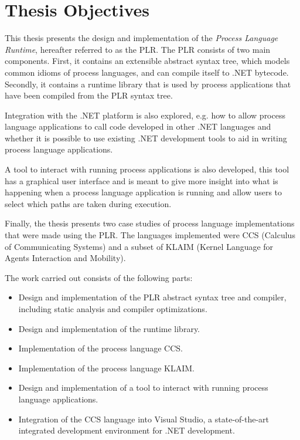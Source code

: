 \section{Thesis Objectives}

	This thesis presents the design and implementation of the \textit{Process 
	Language Runtime}, hereafter referred to as the PLR. The PLR consists of two 
	main components. First, it contains an extensible abstract syntax tree, 
	which models common idioms of process languages, and can compile itself to 
	.NET bytecode. Secondly, it contains a runtime library that is used by 
	process applications that have been compiled from the PLR syntax tree. 

	Integration with the .NET platform is also explored, e.g. how to allow 
	process language applications to call code developed in other .NET languages 
	and whether it is possible to use existing .NET development tools to aid in 
	writing process language applications. 
	
	A tool to interact with running process applications is also developed, this 
	tool has a graphical user interface and is meant to give more insight into 
	what is happening when a process language application is running and allow 
	users to select which paths are taken during execution.

	Finally, the thesis presents two case studies of process language 
	implementations that were made using the PLR. The languages implemented were 
	CCS (Calculus of Communicating Systems) and a subset of KLAIM (Kernel 
	Language for Agents Interaction and Mobility).

	\newpage
	The work carried out consists of the following parts:

	\begin{itemize}
  	\item Design and implementation of the PLR abstract syntax tree and 
  				compiler, including static analysis and compiler optimizations.
  	\item Design and implementation of the runtime library.
  	\item Implementation of the process language CCS.
  	\item Implementation of the process language KLAIM.
  	\item Design and implementation of a tool to interact with running process 
  	language applications.
  	\item Integration of the CCS language into Visual Studio, a 
  				state-of-the-art integrated development environment for .NET 
  				development.
	\end{itemize}


